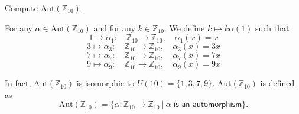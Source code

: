  \begin{example}
     Compute $\text{Aut}(\mathbb{Z}_{10})$.
 \end{example}
 \begin{solution}
     For any $\alpha \in \text{Aut}(\mathbb{Z}_{10})$ and for any $k \in \mathbb{Z}_{10}$. We define $k \mapsto k \alpha(1)$ such that 
     \[
         1 \mapsto \alpha_1 :\quad \mathbb{Z}_{10} \to \mathbb{Z}_{10}, \quad \alpha_1(x) = x
     \]
     \[
         3 \mapsto \alpha_3 :\quad \mathbb{Z}_{10} \to \mathbb{Z}_{10}, \quad \alpha_3(x) = 3x
     \]
     \[
         7 \mapsto \alpha_7 :\quad \mathbb{Z}_{10} \to \mathbb{Z}_{10}, \quad \alpha_7(x) = 7x
     \]
     \[
         9 \mapsto \alpha_9 :\quad \mathbb{Z}_{10} \to \mathbb{Z}_{10}, \quad \alpha_9(x) = 9x
     \]
 
     In fact, $\text{Aut}(\mathbb{Z}_{10})$ is isomorphic to $U(10) = \{ 1, 3, 7, 9\}$. $\text{Aut}(\mathbb{Z}_{10})$ is defined as 
     \[
        \text{Aut}(\mathbb{Z}_{10}) = \{\alpha : \mathbb{Z}_{10} \to \mathbb{Z}_{10} \> | \>  \alpha \textsf{ is an automorphism} \}.
     \]


\end{solution}
